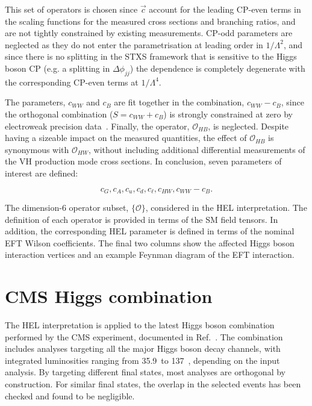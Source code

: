 This set of operators is chosen since $\vec{c}$ account for the leading CP-even terms in the scaling functions for the measured cross sections and branching ratios, and are not tightly constrained by existing measurements. CP-odd parameters are neglected as they do not enter the parametrisation at leading order in $1/\Lambda^2$, and since there is no splitting in the STXS framework that is sensitive to the Higgs boson CP (e.g. a splitting in $\Delta\phi_{jj}$) the dependence is completely degenerate with the corresponding CP-even terms at $1/\Lambda^4$.

The parameters, $c_{WW}$ and $c_B$ are fit together in the combination, $c_{WW}-c_B$, since the orthogonal combination ($S=c_{WW}+c_B$) is strongly constrained at zero by electroweak precision data~\cite{Ellis:2014jta}. Finally, the operator, $\mathcal{O}_{HB}$, is neglected. Despite having a sizeable impact on the measured quantities, the effect of $\mathcal{O}_{HB}$ is synonymous with $\mathcal{O}_{HW}$, without including additional differential measurements of the VH production mode cross sections. In conclusion, seven parameters of interest are defined:

\begin{equation}
    c_G, c_A, c_u, c_d, c_\ell, c_{HW}, c_{WW}-c_B.
\end{equation}

\begin{table}[htbp]
  \centering
  \scriptsize
  \renewcommand{\arraystretch}{2.5}
  \setlength{\tabcolsep}{3pt}
  \caption[Operator subset in the HEL interpretation]
  {
    The dimension-6 operator subset, $\{\mathcal{O}\}$, considered in the HEL interpretation. The definition of each operator is provided in terms of the SM field tensors. In addition, the corresponding HEL parameter is defined in terms of the nominal EFT Wilson coefficients. The final two columns show the affected Higgs boson interaction vertices and an example Feynman diagram of the EFT interaction. 
  }
  \label{tab:hel_operators}
  
\end{table}

\section{CMS Higgs combination}\label{sec:eft_combination}
The HEL interpretation is applied to the latest Higgs boson combination performed by the CMS experiment, documented in Ref.~\cite{CMS-PAS-HIG-19-005}. The combination includes analyses targeting all the major Higgs boson decay channels, with integrated luminosities ranging from 35.9~\fbinv to 137~\fbinv, depending on the input analysis. By targeting different final states, most analyses are orthogonal by construction. For similar final states, the overlap in the selected events has been checked and found to be negligible. 

